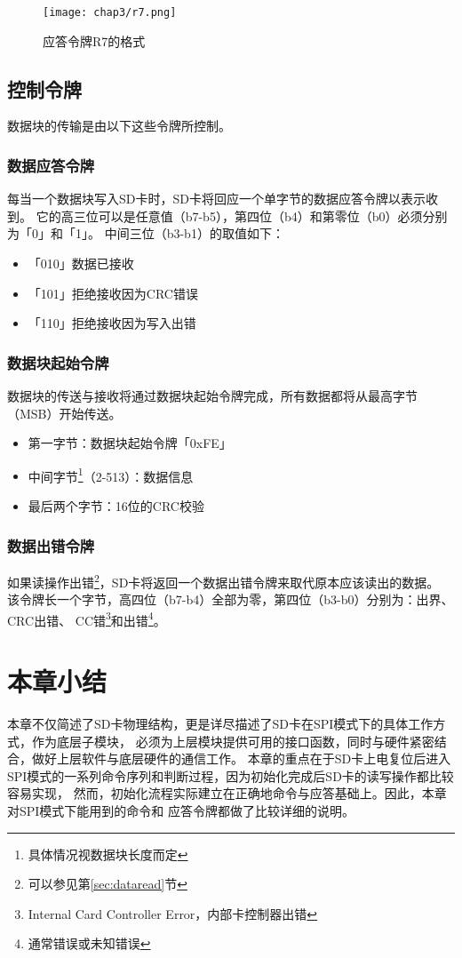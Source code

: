 \begin{figure}[!htb]
    \centering
    \texttt{[image: chap3/r7.png]}
    \\
    \caption{应答令牌R7的格式}\label{fig:r7}
\end{figure}


\subsection{控制令牌}
\label{sec:ctrltoken}

数据块的传输是由以下这些令牌所控制。

\subsubsection{数据应答令牌}
\label{sec:dataresp}
每当一个数据块写入SD卡时，SD卡将回应一个单字节的数据应答令牌以表示收到。
它的高三位可以是任意值（b7-b5），第四位（b4）和第零位（b0）必须分别为「0」和「1」。
中间三位（b3-b1）的取值如下：
\begin{itemize}
    \item 「010」数据已接收
    \item 「101」拒绝接收因为CRC错误
    \item 「110」拒绝接收因为写入出错
\end{itemize}

\subsubsection{数据块起始令牌}
\label{sec:stbltran}

数据块的传送与接收将通过数据块起始令牌完成，所有数据都将从最高字节（MSB）开始传送。
\begin{itemize}
    \item 第一字节：数据块起始令牌「0xFE」
    \item 中间字节\footnote{具体情况视数据块长度而定}（2-513）：数据信息
    \item 最后两个字节：16位的CRC校验
\end{itemize}

\subsubsection{数据出错令牌}
\label{sec:dataerr}

如果读操作出错\footnote{可以参见第\ref{sec:dataread}节}，SD卡将返回一个数据出错令牌来取代原本应该读出的数据。
该令牌长一个字节，高四位（b7-b4）全部为零，第四位（b3-b0）分别为：出界、CRC出错、
CC错\footnote{Internal Card Controller Error，内部卡控制器出错}和出错\footnote{通常错误或未知错误}。

\section{本章小结}
\label{sec:sum3}
本章不仅简述了SD卡物理结构，更是详尽描述了SD卡在SPI模式下的具体工作方式，作为底层子模块，
必须为上层模块提供可用的接口函数，同时与硬件紧密结合，做好上层软件与底层硬件的通信工作。
本章的重点在于SD卡上电复位后进入SPI模式的一系列命令序列和判断过程，因为初始化完成后SD卡的读写操作都比较容易实现，
然而，初始化流程实际建立在正确地命令与应答基础上。因此，本章对SPI模式下能用到的命令和
应答令牌都做了比较详细的说明。
